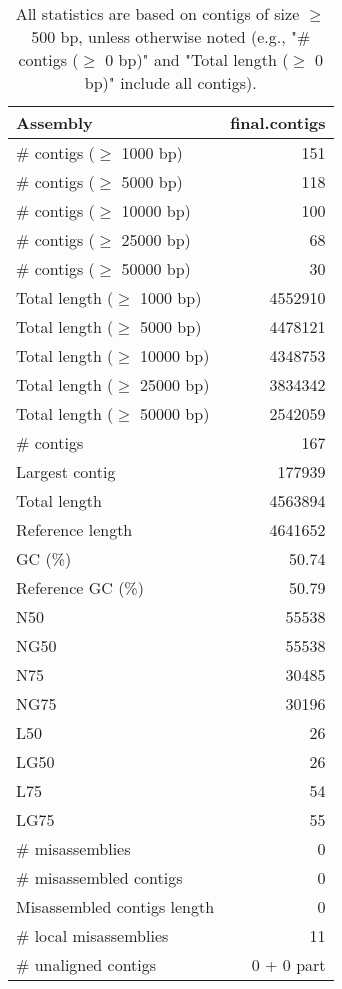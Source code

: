 \documentclass[12pt,a4paper]{article}
\begin{document}
\begin{table}[ht]
\begin{center}
\caption{All statistics are based on contigs of size $\geq$ 500 bp, unless otherwise noted (e.g., "\# contigs ($\geq$ 0 bp)" and "Total length ($\geq$ 0 bp)" include all contigs).}
\begin{tabular}{|l*{1}{|r}|}
\hline
Assembly & final.contigs \\ \hline
\# contigs ($\geq$ 1000 bp) & 151 \\ \hline
\# contigs ($\geq$ 5000 bp) & 118 \\ \hline
\# contigs ($\geq$ 10000 bp) & 100 \\ \hline
\# contigs ($\geq$ 25000 bp) & 68 \\ \hline
\# contigs ($\geq$ 50000 bp) & 30 \\ \hline
Total length ($\geq$ 1000 bp) & 4552910 \\ \hline
Total length ($\geq$ 5000 bp) & 4478121 \\ \hline
Total length ($\geq$ 10000 bp) & 4348753 \\ \hline
Total length ($\geq$ 25000 bp) & 3834342 \\ \hline
Total length ($\geq$ 50000 bp) & 2542059 \\ \hline
\# contigs & 167 \\ \hline
Largest contig & 177939 \\ \hline
Total length & 4563894 \\ \hline
Reference length & 4641652 \\ \hline
GC (\%) & 50.74 \\ \hline
Reference GC (\%) & 50.79 \\ \hline
N50 & 55538 \\ \hline
NG50 & 55538 \\ \hline
N75 & 30485 \\ \hline
NG75 & 30196 \\ \hline
L50 & 26 \\ \hline
LG50 & 26 \\ \hline
L75 & 54 \\ \hline
LG75 & 55 \\ \hline
\# misassemblies & 0 \\ \hline
\# misassembled contigs & 0 \\ \hline
Misassembled contigs length & 0 \\ \hline
\# local misassemblies & 11 \\ \hline
\# unaligned contigs & 0 + 0 part \\ \hline

\end{tabular}
\end{center}
\end{table}
\end{document}
